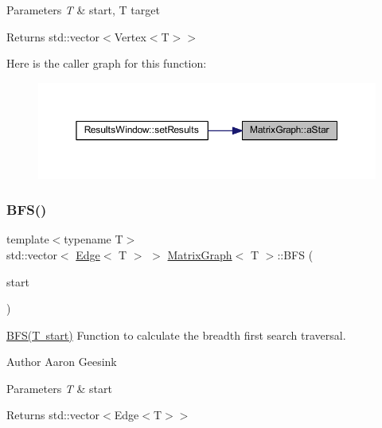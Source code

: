 \begin{DoxyParams}{Parameters}
{\em T} & start, T target \\
\hline
\end{DoxyParams}
\begin{DoxyReturn}{Returns}
std\+::vector$<$Vertex$<$\+T$>$$>$ 
\end{DoxyReturn}
Here is the caller graph for this function\+:
\nopagebreak
\begin{figure}[H]
\begin{center}
\leavevmode
\includegraphics[width=350pt]{class_matrix_graph_a998736fb9402f7f40d97a60d8441c1ec_icgraph}
\end{center}
\end{figure}
\mbox{\label{class_matrix_graph_a3beaf5181ebc3e8f9c0d9610578b5ea3}} 
\subsubsection{\texorpdfstring{BFS()}{BFS()}}
{\footnotesize\ttfamily template$<$typename T$>$ \\
std\+::vector$<$ \mbox{\hyperlink{struct_edge}{Edge}}$<$ T $>$ $>$ \mbox{\hyperlink{class_matrix_graph}{Matrix\+Graph}}$<$ T $>$\+::B\+FS (\begin{DoxyParamCaption}\item[{T}]{start }\end{DoxyParamCaption})}



\mbox{\hyperlink{class_matrix_graph_a3beaf5181ebc3e8f9c0d9610578b5ea3}{B\+F\+S(\+T start)}} Function to calculate the breadth first search traversal. 

\begin{DoxyAuthor}{Author}
Aaron Geesink 
\end{DoxyAuthor}

\begin{DoxyParams}{Parameters}
{\em T} & start \\
\hline
\end{DoxyParams}
\begin{DoxyReturn}{Returns}
std\+::vector$<$Edge$<$\+T$>$$>$ 
\end{DoxyReturn}
\mbox{\label{class_matrix_graph_a3bf901c33eb9d46bee8b05f71b16a9ed}} 
